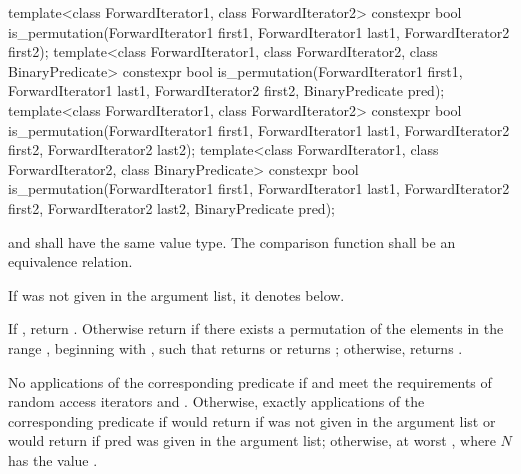 %
\begin{itemdecl}
template<class ForwardIterator1, class ForwardIterator2>
  constexpr bool is_permutation(ForwardIterator1 first1, ForwardIterator1 last1,
                                ForwardIterator2 first2);
template<class ForwardIterator1, class ForwardIterator2,
         class BinaryPredicate>
  constexpr bool is_permutation(ForwardIterator1 first1, ForwardIterator1 last1,
                                ForwardIterator2 first2, BinaryPredicate pred);
template<class ForwardIterator1, class ForwardIterator2>
  constexpr bool is_permutation(ForwardIterator1 first1, ForwardIterator1 last1,
                                ForwardIterator2 first2, ForwardIterator2 last2);
template<class ForwardIterator1, class ForwardIterator2,
         class BinaryPredicate>
  constexpr bool is_permutation(ForwardIterator1 first1, ForwardIterator1 last1,
                                ForwardIterator2 first2, ForwardIterator2 last2,
                                BinaryPredicate pred);
\end{itemdecl}

\begin{itemdescr}
\pnum
\requires {} and  shall have the same
value type. The comparison function shall be an equivalence relation.

\pnum
\remarks If  was not given in the argument list, it denotes
 below.

\pnum
\returns If , return .
Otherwise return  if there exists a permutation of the elements in the
range , beginning with , such that  returns  or
 returns ; otherwise, returns
.

\pnum
\complexity No applications of the corresponding predicate if 
and  meet the requirements of random access iterators and
.
Otherwise, exactly  applications of the
corresponding predicate if 
would return  if  was not given in the argument list
or  would return  if pred was given in the argument list; otherwise, at
worst , where $N$ has the value .
\end{itemdescr}

